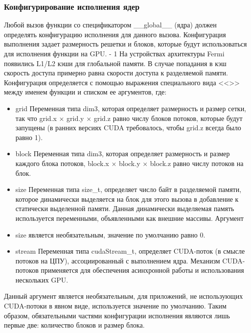 \documentclass[a4paper, final]{article}
\begin{document}
 \subsubsection{Конфигурирование исполнения ядер}
Любой вызов функции со 
спецификатором \_\_global\_\_ (ядра) должен определять конфигурацию 
исполнения для данного вызова. Конфигурация выполнения задает 
размерность решетки и блоков, которые будут использоваться для 
исполнения функции на GPU. - 1 На устройствах архитектуры Fermi появились 
L1/L2 кэши для глобальной памяти. В случае попадания в кэш скорость 
доступа примерно равна скорости доступа к разделяемой памяти. 
Конфигурация определяется с помощью выражения специального вида <<>> 
между именем функции и списком ее аргументов, где:
\begin{itemize}
\item grid Переменная типа dim3, которая определяет размерность и размер 
сетки, так что grid.x × grid.y × grid.z равно числу блоков потоков, которые 
будут запущены (в ранних версиях CUDA требовалось, чтобы grid.z всегда 
было равно 1).
\item block Переменная типа dim3, которая определяет размерность и размер 
каждого блока потоков, block.x × block.y × block.z равно числу потоков на 
блок. 
\item size Переменная типа size\_t, определяет число байт в разделяемой памяти, 
которое динамически выделяется на блок для этого вызова в добавление к 
статически выделенной памяти. Данная динамически выделяемая память 
используется переменными, объявленными как внешние массивы. Аргумент 
\item size является необязательным, значение по умолчанию равно 0.
\item stream Переменная типа cudaStream\_t, определяет CUDA-поток (в смысле 
потоков на ЦПУ), ассоциированный с выполнением ядра. Механизм CUDA-
потоков применяется для обеспечения асинхронной работы и использования 
нескольких GPU.
\end{itemize}
 Данный аргумент является необязательным, для приложений, не 
использующих CUDA-потоки в явном виде, используется значение по 
умолчанию. 
Таким образом, обязательными частями конфигурации исполнения являются 
лишь первые две: количество блоков и размер блока.
\end{document}
